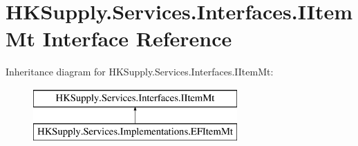 \hypertarget{interface_h_k_supply_1_1_services_1_1_interfaces_1_1_i_item_mt}{}\section{H\+K\+Supply.\+Services.\+Interfaces.\+I\+Item\+Mt Interface Reference}
\label{interface_h_k_supply_1_1_services_1_1_interfaces_1_1_i_item_mt}
Inheritance diagram for H\+K\+Supply.\+Services.\+Interfaces.\+I\+Item\+Mt\+:\begin{figure}[H]
\begin{center}
\leavevmode
\includegraphics[height=2.000000cm]{interface_h_k_supply_1_1_services_1_1_interfaces_1_1_i_item_mt}
\end{center}
\end{figure}
